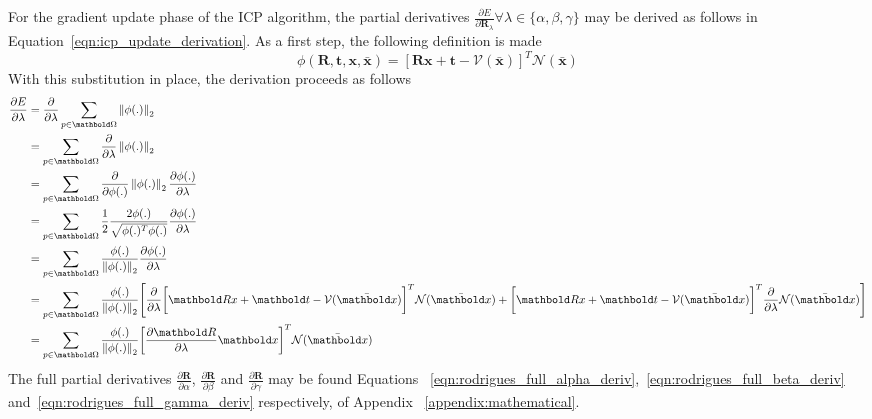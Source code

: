 For the gradient update phase of the ICP algorithm, the partial derivatives
\(\frac{\partial E}{\partial \bm{R}_{\lambda}} \forall \lambda \in \{\alpha, \beta, \gamma\}\) 
may be derived as follows in Equation~\ref{eqn:icp_update_derivation}.
As a first step, the following definition is made
\begin{equation}
  \label{eqn:icp_deriv_sub}
  \phi(\bm{R}, \bm{t}, \bm{x}, \bar{\bm{x}}) =
  \left[
    \bm{Rx} + \bm{t} - \mathcal{V}(\bar{\bm{x}})
  \right]^{T}
  \mathcal{N}(\bar{\bm{x}})
\end{equation}
With this substitution in place, the derivation proceeds as follows
\begin{align}
  \label{eqn:icp_update_derivation_rot}
  \frac{\partial E}{\partial \lambda} & =
  \frac{\partial}{\partial \lambda}
  \sum_{p \in \bm{\Omega}}
  \norm{\phi(.)}\\
  & = \sum_{p \in \bm{\Omega}}
  \frac{\partial}{\partial \lambda}
  \norm{\phi(.)}\\
  & = \sum_{p \in \bm{\Omega}}
  \frac{\partial}{\partial \phi(.)} \norm{\phi(.)}
  \frac{\partial \phi(.)}{\partial \lambda}\\
  & = \sum_{p \in \bm{\Omega}}
  \frac{1}{2}\frac{2 \phi(.)}{\sqrt{\phi(.)^{T}\phi(.)}}
  \frac{\partial \phi(.)}{\partial \lambda}\\
  & = \sum_{p \in \bm{\Omega}}
  \frac{\phi(.)}{\norm{\phi(.)}}
  \frac{\partial \phi(.)}{\partial \lambda}\\
  & = \sum_{p \in \bm{\Omega}}
  \frac{\phi(.)}{\norm{\phi(.)}}
  \Bigg[ \frac{\partial}{\partial \lambda}
  \bigg[ \bm{Rx} + \bm{t} - \mathcal{V}(\bar{\bm{x}}) \bigg]^{T}
  \mathcal{N}(\bar{\bm{x}}) + 
  \bigg[ \bm{Rx} + \bm{t} - \mathcal{V}(\bar{\bm{x}}) \bigg]^{T}
  \frac{\partial}{\partial \lambda}
  \mathcal{N}(\bar{\bm{x}})\Bigg]\\
  & = \sum_{p \in \bm{\Omega}}
  \frac{\phi(.)}{\norm{\phi(.)}}
  \bigg[ \frac{\partial \bm{R}}{\partial \lambda}
  \bm{x}\bigg]^{T}
  \mathcal{N}(\bar{\bm{x}})
\end{align}
The full partial derivatives \(\frac{\partial \bm{R}}{\partial \alpha}\),
\(\frac{\partial \bm{R}}{\partial \beta}\) and
\(\frac{\partial \bm{R}}{\partial \gamma}\) may be found Equations
~\ref{eqn:rodrigues_full_alpha_deriv},~\ref{eqn:rodrigues_full_beta_deriv}
and~\ref{eqn:rodrigues_full_gamma_deriv} respectively, of Appendix 
~\ref{appendix:mathematical}.

